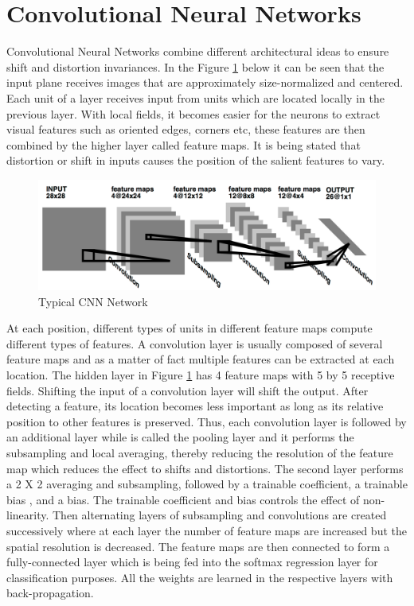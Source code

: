 \section{Convolutional Neural Networks} \label{sec:build5}

Convolutional Neural Networks \cite{cnn} combine different architectural ideas to ensure  shift and distortion invariances. In the Figure \ref{fig:Figure19} below it  can be seen that the input plane receives images that are approximately size-normalized and centered. Each unit of a layer receives input from units which are located locally in the previous layer. With local fields, it becomes easier for the neurons to extract visual features such as oriented edges, corners etc, these features are then combined by the higher layer called feature maps. It is being stated that distortion or shift in inputs causes the position of the salient features to vary. 

\begin{figure}[t]
	\begin{center}
		\includegraphics[width=\textwidth]{Figures/Figure19}
	\end{center}
	\caption{Typical CNN Network}
	\label{fig:Figure19}
\end{figure}


At each position, different types of units in different feature maps compute different types of features. A convolution layer is usually composed of several feature maps and as a matter of fact multiple features can be extracted at each location. The hidden layer in Figure \ref{fig:Figure19} has 4 feature maps with 5 by 5 receptive fields. Shifting the input of a convolution layer will shift the output. After detecting a feature, its location becomes less important as long as its relative position to other features is preserved. Thus, each convolution layer is followed by an additional layer while is called the pooling layer and it performs the subsampling and local averaging, thereby reducing the resolution of the feature map which reduces the effect to shifts and distortions. The second layer performs a 2 X 2 averaging and subsampling, followed by a trainable coefficient, a trainable bias , and a bias. The trainable coefficient and bias controls the effect of non-linearity. Then alternating layers of subsampling and convolutions are created successively where at each layer the number of feature maps are increased but the spatial resolution is decreased. The feature maps are then connected to form a fully-connected layer which is being fed into the softmax regression layer for classification purposes. All the weights are learned in the respective layers with back-propagation.

